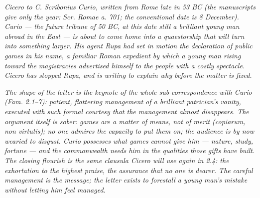 
\textit{Cicero to C. Scribonius Curio, written from Rome
late in 53 BC (the manuscripts give only the year:
\textit{Scr. Romae a. 701}; the conventional date is 8
December). Curio --- the future tribune of 50 BC, at this
date still a brilliant young man abroad in the East --- is
about to come home into a quaestorship that will turn into
something larger. His agent Rupa had set in motion the
declaration of public games \textit{in his name}, a
familiar Roman expedient by which a young man rising
toward the magistracies advertised himself to the people
with a costly spectacle. Cicero has stopped Rupa, and is
writing to explain why before the matter is fixed.}

\textit{The shape of the letter is the keynote of the
whole sub-correspondence with Curio (\textit{Fam.}
2.1--7): patient, flattering management of a brilliant
patrician's vanity, executed with such formal courtesy
that the management almost disappears. The argument
itself is sober: games are a matter of means, not of
merit (\textit{copiarum, non virtutis}); no one admires
the capacity to put them on; the audience is by now
wearied to disgust. Curio possesses what games cannot
give him --- nature, study, fortune --- and the
commonwealth needs him in the qualities those gifts
have built. The closing flourish is the same
\textit{clausula} Cicero will use again in 2.4: the
exhortation to the highest praise, the assurance that no
one is dearer. The careful management is the message;
the letter exists to forestall a young man's mistake
without letting him feel managed.}
